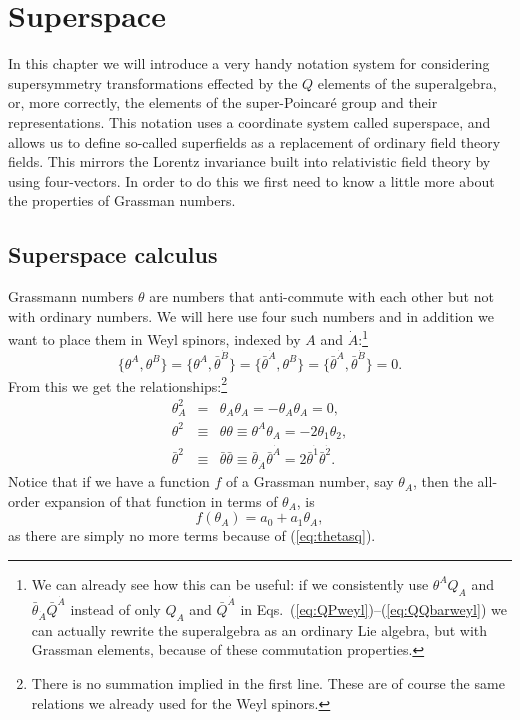 \documentclass[notes.tex]{subfiles}
\begin{document}
\chapter{Superspace}
\label{chap:superspace}
In this chapter we will introduce a very handy notation system for considering supersymmetry transformations effected by the $Q$ elements of the superalgebra, or, more correctly, the elements of the super-Poincar\'e group and their representations. This notation uses a coordinate system called superspace, and allows us to define so-called superfields as a replacement of ordinary field theory fields. This mirrors the Lorentz invariance built into relativistic field theory by using four-vectors. In order to do this we first need to know a little more about the properties of Grassman numbers.


\section{Superspace calculus}
\label{app:calc}
Grassmann numbers $\theta$ are numbers that anti-commute with each other but not with ordinary numbers. We will here use four such numbers and in addition we want to place them in Weyl spinors, indexed by $A$ and $\dot{A}$:\footnote{We can already see how this can be useful: if we consistently use $\theta^AQ_A$ and $\bar{\theta}_{\dot{A}}\bar{Q}^{\dot{A}}$ instead of only $Q_A$ and $\bar{Q}^{\dot{A}}$ in Eqs.~(\ref{eq:QPweyl})--(\ref{eq:QQbarweyl}) we can actually rewrite the superalgebra as an ordinary Lie algebra, but with Grassman elements, because of these commutation properties.}
\[\{\theta^A, \theta^B\} = \{\theta^A, \bar{\theta}^{\dot{B}}\} = \{ \bar{\theta}^{\dot{A}}, \theta^B\} = \{\bar{\theta}^{\dot{A}}, \bar{\theta}^{\dot{B}}\} =0.\]
From this we get the relationships:\footnote{There is no summation implied in the first line. These are of course the same relations we already used for the Weyl spinors.}
\begin{eqnarray}
\theta_A^2 &=& \theta_A \theta_A = -\theta_A \theta_A = 0, \label{eq:thetasq}\\
\theta^2 &\equiv& \theta\theta \equiv \theta^A\theta_A = -2\theta_1\theta_2,\\
\bar{\theta}^2 &\equiv& \bar{\theta}\bar{\theta} \equiv \bar{\theta}_{\dot{A}}\bar{\theta}^{\dot{A}} = 2\bar{\theta}^{\dot{1}}\bar{\theta}^{\dot{2}}.
\end{eqnarray}
Notice that if we have a function $f$ of a Grassman number, say $\theta_A$, then the all-order expansion of that function in terms of $\theta_A$, is
\begin{equation}
f(\theta_A) = a_0 + a_1 \theta_A,\label{eq:fexp}
\end{equation}
as there are simply no more terms because of (\ref{eq:thetasq}).
\end{document}
